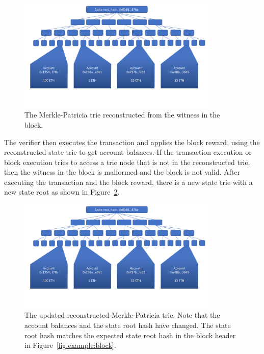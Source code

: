 \documentclass[12pt]{article}
\newcommand{\figurewidth}{0.85\textwidth}
\begin{document}
\begin{figure}[H]
  \centering
  \includegraphics[width=\figurewidth,page=5]{../figures/design/example.pdf}
  \caption{The Merkle-Patricia trie reconstructed from the witness in the block.}
  \label{fig:example:reconstructed}
\end{figure}

The verifier then executes the transaction and applies the block reward, using the reconstructed state trie to get account balances. If the transaction execution or block execution tries to access a trie node that is not in the reconstructed trie, then the witness in the block is malformed and the block is not valid. After executing the transaction and the block reward, there is a new state trie with a new state root as shown in Figure~\ref{fig:example:newconstructed}.

\begin{figure}[H]
  \centering
  \includegraphics[width=\figurewidth,page=6]{../figures/design/example.pdf}
  \caption{The updated reconstructed Merkle-Patricia trie. Note that the account balances and the state root hash have changed. The state root hash matches the expected state root hash in the block header in Figure~\ref{fig:example:block}.}
  \label{fig:example:newconstructed}
\end{figure}
\end{document}
